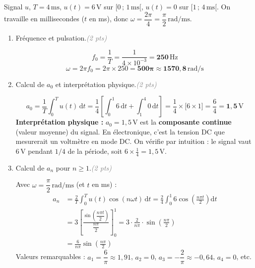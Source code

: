 \documentclass[a4paper,11pt]{article}
\newcommand{\dt}{\mathrm{d}t}
\newcommand{\reponse}[1]{%
  \begin{tcolorbox}[corrbox={}]
    #1
  \end{tcolorbox}%
}
\newcommand{\pts}[1]{\hfill\textcolor{gray}{\small\textit{(#1 pts)}}}
\begin{document}
\begin{tcolorbox}[exobox={Exercice 2 \hfill \normalfont\textit{(10 points)}}]
  Signal $u$, $T = 4\,\mathrm{ms}$, $u(t)=6\,\mathrm{V}$ sur $[0\,;\,1\,\mathrm{ms}[$,
  $u(t)=0$ sur $[1\,;\,4\,\mathrm{ms}[$.
  On travaille en millisecondes ($t$ en ms), donc $\omega = \dfrac{2\pi}{4} = \dfrac{\pi}{2}\,\mathrm{rad/ms}$.
\end{tcolorbox}

\begin{enumerate}[label=\textbf{\arabic*.}, leftmargin=*, itemsep=0.4cm]

  \item Fréquence et pulsation.\pts{2}

  \reponse{
    \[
      f_0 = \frac{1}{T} = \frac{1}{4\times10^{-3}} = \mathbf{250\,\mathrm{Hz}}
    \]
    \[
      \omega = 2\pi f_0 = 2\pi \times 250 = \mathbf{500\pi \approx 1570{,}8\,\mathrm{rad/s}}
    \]
  }

  \item Calcul de $a_0$ et interprétation physique.\pts{2}

  \reponse{
    \[
      a_0 = \frac{1}{T}\int_0^{T} u(t)\,\dt
           = \frac{1}{4}\left[\int_0^{1} 6\,\dt + \int_1^{4} 0\,\dt\right]
           = \frac{1}{4}\times\bigl[6\times 1\bigr]
           = \frac{6}{4} = \mathbf{1{,}5\,\mathrm{V}}
    \]
    \textbf{Interprétation physique :} $a_0 = 1{,}5\,\mathrm{V}$ est la \textbf{composante continue}
    (valeur moyenne) du signal. En électronique, c'est la tension DC que mesurerait un voltmètre en mode DC.
    On vérifie par intuition : le signal vaut $6\,\mathrm{V}$ pendant $1/4$ de la période,
    soit $6 \times \frac{1}{4} = 1{,}5\,\mathrm{V}$.
  }

  \item Calcul de $a_n$ pour $n \geq 1$.\pts{2}

  \reponse{
    Avec $\omega = \dfrac{\pi}{2}\,\mathrm{rad/ms}$ (et $t$ en ms) :
    \begin{align*}
      a_n &= \frac{2}{T}\int_0^{T} u(t)\cos(n\omega t)\,\dt
           = \frac{2}{4}\int_0^{1} 6\cos\!\left(\frac{n\pi t}{2}\right)\dt \\[4pt]
          &= 3\left[\frac{\sin\!\left(\dfrac{n\pi t}{2}\right)}{\dfrac{n\pi}{2}}\right]_0^{1}
           = 3 \cdot \frac{2}{n\pi}\cdot\sin\!\left(\frac{n\pi}{2}\right) \\[6pt]
          &= \boxed{\frac{6}{n\pi}\sin\!\left(\frac{n\pi}{2}\right)}
    \end{align*}
    Valeurs remarquables :
    $a_1 = \dfrac{6}{\pi}\approx 1{,}91$,\quad
    $a_2 = 0$,\quad
    $a_3 = -\dfrac{2}{\pi}\approx -0{,}64$,\quad
    $a_4 = 0$, etc.
  }


\end{enumerate}
\end{document}
